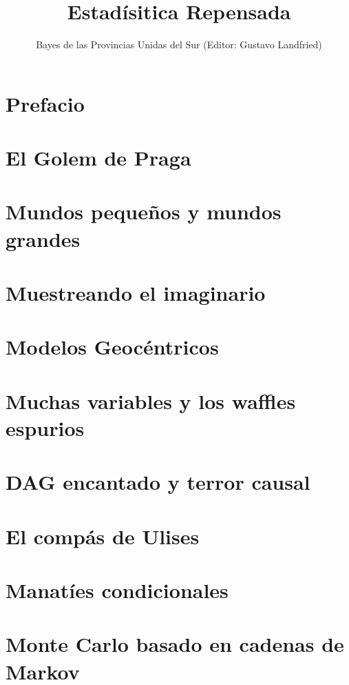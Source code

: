 \documentclass[a4paper,10pt]{book}
\title{Estadísitica Repensada}
\author{Bayes de las Provincias Unidas del Sur (Editor: Gustavo Landfried)}
\begin{document}
\maketitle

\tableofcontents

\chapter{Prefacio}

\chapter{El Golem de Praga}

\chapter{Mundos pequeños y mundos grandes}

\chapter{Muestreando el imaginario}

\chapter{Modelos Geocéntricos}

\chapter{Muchas variables y los waffles espurios}

\chapter{DAG encantado y terror causal}

\chapter{El compás de Ulises}

\chapter{Manatíes condicionales}

\chapter{Monte Carlo basado en cadenas de Markov}
\end{document}
